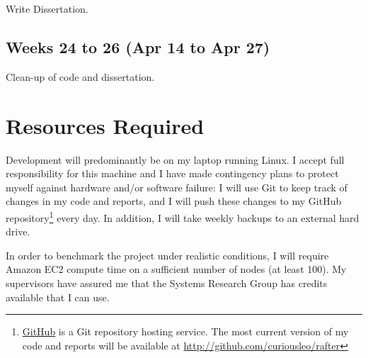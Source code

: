 \documentclass[12pt]{scrartcl}
\begin{document}
Write Dissertation.


\subsection{Weeks 24 to 26 (Apr 14 to Apr 27)%
  \label{weeks-24-to-26-apr-14-to-apr-27}%
}

Clean-up of code and dissertation.


\section{Resources Required%
  \label{resources-required}%
}
%
Development will predominantly be on my laptop running Linux. I accept full responsibility for this machine and I have made contingency plans to protect myself against hardware and/or software failure: I will use Git to keep track of changes in my code and reports, and I will push these changes to my GitHub repository\footnote{\href{http://github.com}{GitHub} is a Git repository hosting service. The most current version of my code and reports will be available at \url{http://github.com/curiousleo/rafter}}  every day. In addition, I will take weekly backups to an external hard drive.

In order to benchmark the project under realistic conditions, I will require Amazon EC2 compute time on a sufficient number of nodes (at least 100). My supervisors have assured me that the Systems Research Group has credits available that I can use.



\end{document}
